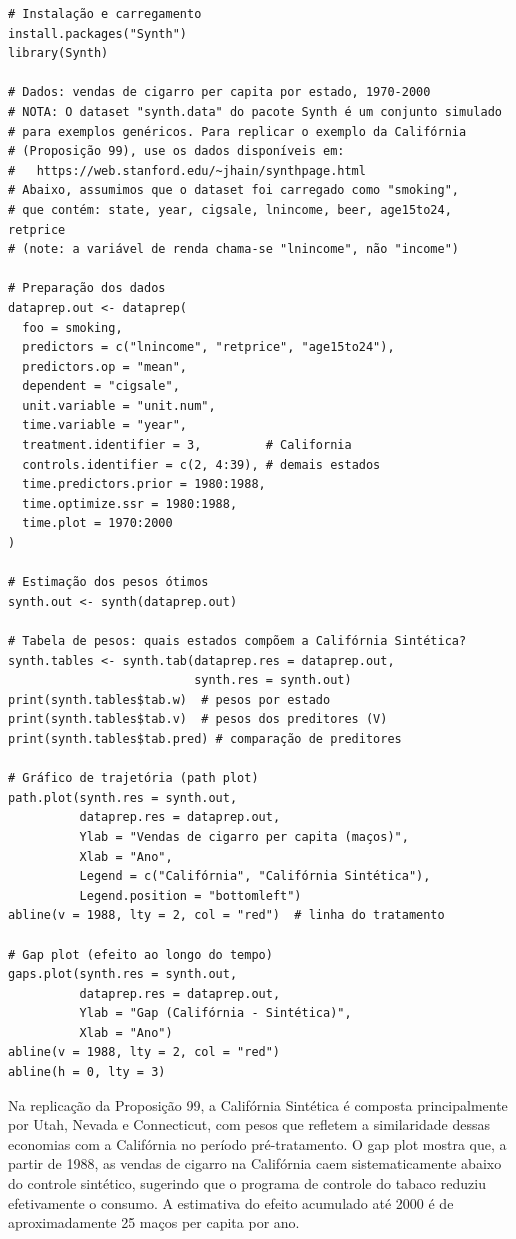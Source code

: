 \documentclass[12pt, a4paper, openany]{book}
\begin{document}
\begin{lstlisting}[style=Rstyle]
# Instalação e carregamento
install.packages("Synth")
library(Synth)

# Dados: vendas de cigarro per capita por estado, 1970-2000
# NOTA: O dataset "synth.data" do pacote Synth é um conjunto simulado
# para exemplos genéricos. Para replicar o exemplo da Califórnia
# (Proposição 99), use os dados disponíveis em:
#   https://web.stanford.edu/~jhain/synthpage.html
# Abaixo, assumimos que o dataset foi carregado como "smoking",
# que contém: state, year, cigsale, lnincome, beer, age15to24, retprice
# (note: a variável de renda chama-se "lnincome", não "income")

# Preparação dos dados
dataprep.out <- dataprep(
  foo = smoking,
  predictors = c("lnincome", "retprice", "age15to24"),
  predictors.op = "mean",
  dependent = "cigsale",
  unit.variable = "unit.num",
  time.variable = "year",
  treatment.identifier = 3,         # California
  controls.identifier = c(2, 4:39), # demais estados
  time.predictors.prior = 1980:1988,
  time.optimize.ssr = 1980:1988,
  time.plot = 1970:2000
)

# Estimação dos pesos ótimos
synth.out <- synth(dataprep.out)

# Tabela de pesos: quais estados compõem a Califórnia Sintética?
synth.tables <- synth.tab(dataprep.res = dataprep.out,
                          synth.res = synth.out)
print(synth.tables$tab.w)  # pesos por estado
print(synth.tables$tab.v)  # pesos dos preditores (V)
print(synth.tables$tab.pred) # comparação de preditores

# Gráfico de trajetória (path plot)
path.plot(synth.res = synth.out,
          dataprep.res = dataprep.out,
          Ylab = "Vendas de cigarro per capita (maços)",
          Xlab = "Ano",
          Legend = c("Califórnia", "Califórnia Sintética"),
          Legend.position = "bottomleft")
abline(v = 1988, lty = 2, col = "red")  # linha do tratamento

# Gap plot (efeito ao longo do tempo)
gaps.plot(synth.res = synth.out,
          dataprep.res = dataprep.out,
          Ylab = "Gap (Califórnia - Sintética)",
          Xlab = "Ano")
abline(v = 1988, lty = 2, col = "red")
abline(h = 0, lty = 3)
\end{lstlisting}

\begin{exemplobox}
Na replicação da Proposição 99, a Califórnia Sintética é composta principalmente por Utah, Nevada e Connecticut, com pesos que refletem a similaridade dessas economias com a Califórnia no período pré-tratamento. O gap plot mostra que, a partir de 1988, as vendas de cigarro na Califórnia caem sistematicamente abaixo do controle sintético, sugerindo que o programa de controle do tabaco reduziu efetivamente o consumo. A estimativa do efeito acumulado até 2000 é de aproximadamente 25 maços per capita por ano.
\end{exemplobox}
\end{document}
